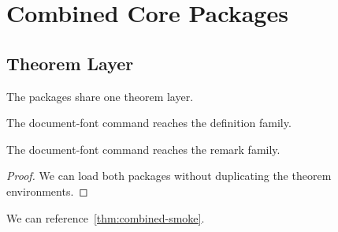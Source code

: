 \documentclass{book}
\begin{document}
\chapter{Combined Core Packages}
\section{Theorem Layer}
\begin{theorem}\label{thm:combined-smoke}The packages share one theorem layer.\end{theorem}
\begin{definition}The document-font command reaches the definition family.\end{definition}
\begin{remark}The document-font command reaches the remark family.\end{remark}
\begin{proof}We can load both packages without duplicating the theorem environments.\end{proof}
We can reference~\cref{thm:combined-smoke}.
\end{document}
